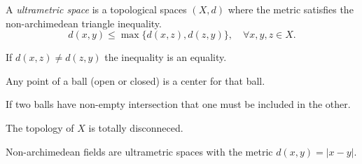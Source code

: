 \begin{definition}
	A \emph{ultrametric space} is a topological spaces $(X, d)$ where the metric satisfies the non-archimedean triangle inequality. 
	\[
		d(x, y) \le \max \{d(x, z) ,d(z, y)\}, \quad \forall x, y ,z \in X
	.\] 
\end{definition}
\begin{exercise}
	If $d(x,z) \ne d(z,y)$ the inequality is an equality. 
\end{exercise}
\begin{corollary}
	Any point of a ball (open or closed) is a center for that ball. 
\end{corollary}
\begin{corollary}
	If two balls have non-empty intersection that one must be included in the other. 
\end{corollary}
\begin{corollary}
	The topology of $X$ is totally disconneced. 
\end{corollary}

Non-archimedean fields are ultrametric spaces with the metric $d(x, y) = |x - y|$. 

